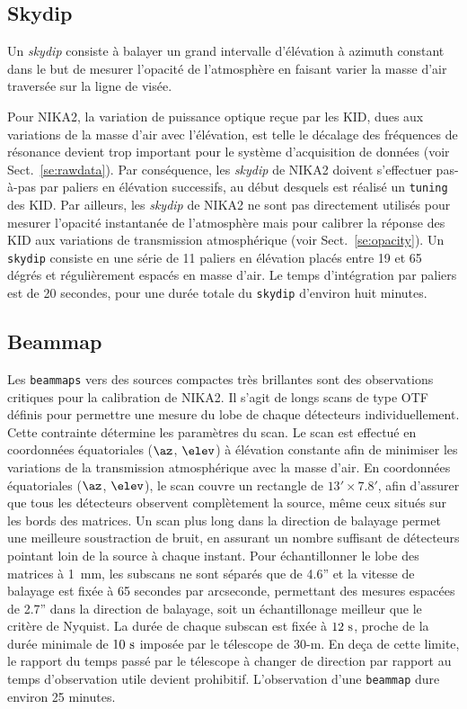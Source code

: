 \subsection{Skydip}
\label{se:skydip}

Un \emph{skydip} consiste à balayer un grand intervalle d'élévation à
azimuth constant dans le but de mesurer l'opacité de l'atmosphère en
faisant varier la masse d'air traversée sur la ligne de visée. 

Pour NIKA2, la variation de puissance optique reçue par les KID, dues
aux variations de la masse d'air avec l'élévation, est telle le décalage des
fréquences de résonance devient trop important pour le système
d'acquisition de données (voir Sect.~\ref{se:rawdata}). Par
conséquence, les \emph{skydip} de NIKA2 doivent s'effectuer pas-à-pas
par paliers en élévation successifs, au début desquels est réalisé un
{\tt tuning} des KID. Par ailleurs, les \emph{skydip} de NIKA2 ne sont
pas directement utilisés pour mesurer l'opacité instantanée de
l'atmosphère mais pour calibrer la réponse des KID aux variations de
transmission atmosphérique (voir Sect.~\ref{se:opacity}). Un {\tt skydip}
consiste en une série de 11 paliers en élévation placés entre 19 et 65
dégrés et régulièrement espacés en masse d'air. Le temps d'intégration
par paliers est de 20 secondes, pour une durée totale du {\tt skydip}
d'environ huit minutes.

\subsection{Beammap}
\label{se:beammap}

Les {\tt beammaps} vers des sources compactes très brillantes sont des
observations critiques pour la calibration de NIKA2. Il s'agit de
longs scans de type OTF définis pour permettre une mesure du lobe de
chaque détecteurs individuellement. Cette contrainte détermine les
paramètres du scan. Le scan est effectué en coordonnées équatoriales
($\az$, $\elev$) à élévation constante afin de minimiser les
variations de la transmission atmosphérique avec la masse d'air. En
coordonnées équatoriales ($\az$, $\elev$), le scan couvre un rectangle
de $13' \times 7.8'$, afin d'assurer que tous
les détecteurs observent complètement la source, même ceux situés
sur les bords des matrices. Un scan plus long dans la direction de
balayage permet une meilleure soustraction de bruit, en assurant un
nombre suffisant de détecteurs pointant loin de la source à chaque
instant. Pour échantillonner le lobe des matrices à 1~mm,
les subscans ne sont séparés que de 4.6'' et la vitesse de balayage
est fixée à 65 secondes par arcseconde, permettant des mesures
espacées de 2.7'' dans la direction de balayage, soit un
échantillonage meilleur que le critère de Nyquist. La durée de chaque
subscan est fixée à $12~\rm{s}$, proche de la durée minimale de
$10~\rm{s}$ imposée par le télescope de 30-m. En deça de cette limite,
le rapport du temps passé par le télescope à changer de direction par
rapport au temps d'observation utile devient prohibitif. L'observation
d'une {\tt beammap} dure environ 25 minutes. 




